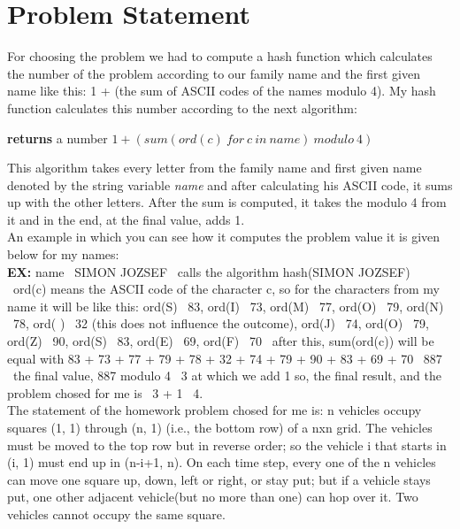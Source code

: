 \documentclass[14pt]{article}
\begin{document}
\section{Problem Statement}
For choosing the problem we had to compute a hash function which calculates the number of the problem according to our family name and the first given name like this: 1 + (the sum of ASCII codes of the names modulo 4). My hash function calculates this number according to the next algorithm:
\vspace{2.5 mm}
\begin{algorithmic}
 \textbf{returns} a number
    \State \Return $1 + (sum(ord(c) \ for \ c \ in \ name) \ modulo \ 4)$
\EndFunction
\end{algorithmic}
\vspace{2.5 mm}
This algorithm takes every letter from the family name and first given name denoted by the string variable \textit{name} and after calculating his ASCII code, it sums up with the other letters. After the sum is computed, it takes the modulo 4 from it and in the end, at the final value, adds 1.
\vspace{2.5 mm}
\\An example in which you can see how it computes the problem value it is given below for my names:
\vspace{2.5 mm}
\\\textbf{EX:} name \eq \ SIMON JOZSEF \textrightarrow \ calls the algorithm hash(SIMON JOZSEF) \textrightarrow \ ord(c) means the ASCII code of the character c, so for the characters from my name it will be like this: ord(S) \eq \ 83, ord(I) \eq \ 73, ord(M) \eq \ 77, ord(O) \eq \ 79, ord(N) \eq \ 78, ord( ) \eq \ 32 (this does not influence the outcome), ord(J) \eq \ 74, ord(O) \eq \ 79, ord(Z) \eq \ 90, ord(S) \eq \ 83, ord(E) \eq \ 69, ord(F) \eq \ 70 \textrightarrow \ after this, sum(ord(c)) will be equal with 83 + 73 + 77 + 79 + 78 + 32 + 74 + 79 + 90 + 83 + 69 + 70 \eq \ 887 \textrightarrow \ the final value, 887 modulo 4 \eq \ 3 at which we add 1 so, the final result, and the problem chosed for me is \textrightarrow \ 3 + 1 \eq \ 4.
\vspace{2.5 mm}
\\The statement of the homework problem chosed for me is: n vehicles occupy squares (1, 1) through (n, 1) (i.e., the bottom row) of a nxn grid. The vehicles must be moved to the top row but in reverse order; so the vehicle i that starts in (i, 1) must end up in (n-i+1, n). On each time step, every one of the n vehicles can move one square up, down, left or right, or stay put; but if a vehicle stays put, one other adjacent vehicle(but no more than one) can hop over it. Two vehicles cannot occupy the same square.
\end{document}
